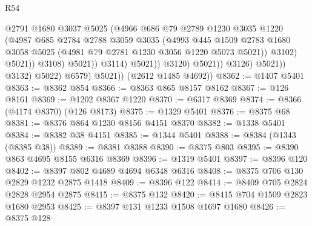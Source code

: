 \begin{lexlean}{R54}
\begin{coremodule}
                                          @2791
                                          @1680
                                          @3037
                                          @5025
                                          (@4966
                                            @686
                                            @79
                                            @2789
                                            @1230
                                            @3035
                                            @1220
                                            (@4987
                                              @685
                                              @2784
                                              @2788
                                              @3059
                                              @3035
                                              (@4993
                                                @445
                                                @1509
                                                @2783
                                                @1680
                                                @3058
                                                @5025
                                                (@4981 @79 @2781 @1230 @3056 @1220 @5073 @5021))
                                              @3102)
                                            @5021))
                                        @3108)
                                      @5021))
                                  @3114)
                                @5021))
                            @3120)
                          @5021))
                      @3126)
                    @5021))
                @3132)
              @5022)
            @6579)
          @5021))
      (@2612 @1485 @4692))
@8362 := @1407 @5401
@8363 := @8362 @854
@8366 := @8363 @865 @8157 @8162
@8367 := @126 @8161
@8369 := @1202 @8367 @1220
@8370 := @6317 @8369
@8374 := @8366 (@4174 @8370) (@126 @8173)
@8375 := @1329 @5401
@8376 := @8375 @68
@8381 := @8376 @864 @1230 @8156 @4151 @8370
@8382 := @1338 @5401
@8384 := @8382 @38 @4151
@8385 := @1344 @5401
@8388 := @8384 (@1343 (@8385 @38))
@8389 := @8381 @8388
@8390 := @8375 @803
@8395 := @8390 @863 @4695 @8155 @6316 @8369
@8396 := @1319 @5401
@8397 := @8396 @120
@8402 := @8397 @802 @4689 @4694 @6348 @6316
@8408 := @8375 @706 @130 @2829 @1232 @2875 @1418
@8409 := @8396 @122
@8414 := @8409 @705 @2824 @2828 @2954 @2875
@8415 := @8375 @132
@8420 := @8415 @704 @1509 @2823 @1680 @2953
@8425 := @8397 @131 @1233 @1508 @1697 @1680
@8426 := @8375 @128

\end{coremodule}
\end{lexlean}
